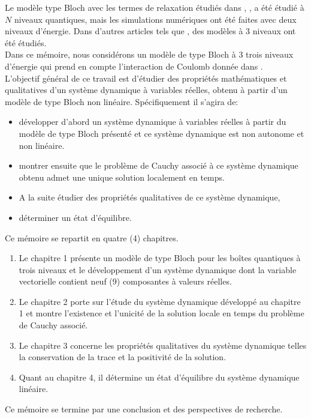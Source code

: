 \documentclass[12pt,a4paper,openany,oneside]{book}
\begin{document}
Le modèle type Bloch avec les termes de relaxation étudiés dans \cite{mareference2}, \cite{mareference4}, \cite{mareference8} a été étudié à $N$ niveaux quantiques, mais les simulations numériques ont été faites avec deux niveaux d'énergie. Dans d'autres articles tels que \cite{mareference9}, des modèles à 3 niveaux ont été étudiés.\\
  Dans ce mémoire, nous considérons un modèle de type Bloch à 3 trois niveaux d'énergie qui prend en compte  l'interaction de Coulomb donnée dans \cite{mareference1}. \\
 L'objectif général de ce travail est d'étudier des propriétés mathématiques et qualitatives  d'un système dynamique à variables réelles, obtenu à partir d'un modèle de type Bloch non linéaire. Spécifiquement il s'agira de:
 \begin{itemize}[label=$\blacktriangleright$]
 \item développer d'abord un système dynamique à variables réelles à partir du modèle de type Bloch présenté et ce système dynamique est non autonome et non linéaire.
\item montrer ensuite que le problème de Cauchy associé à ce système dynamique obtenu admet une unique solution localement en temps.
\item A la suite étudier des propriétés qualitatives de ce système dynamique,
\item déterminer un état d'équilibre.
 \end{itemize}
 Ce mémoire se repartit en quatre (4) chapitres.
 \begin{enumerate}
 \item Le chapitre 1 présente un modèle de type Bloch pour les boîtes quantiques à trois niveaux et le développement d'un système dynamique dont la variable vectorielle contient neuf (9) composantes à valeurs réelles.                                                                                                
\item Le chapitre 2 porte sur l'étude du système dynamique développé au chapitre 1 et montre  l'existence et l’unicité de la solution locale en temps du problème de Cauchy associé.
\item Le chapitre 3 concerne les propriétés qualitatives du système dynamique telles la conservation de la trace et la positivité de la solution.
\item Quant au chapitre 4, il détermine un état d'équilibre du système dynamique linéaire.
 \end{enumerate}
 Ce mémoire se termine par une conclusion et des perspectives de recherche.
 
\end{document}
